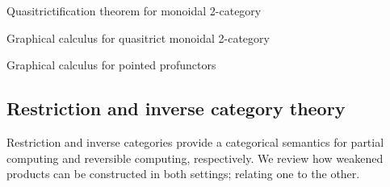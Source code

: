 \begin{theorem}
Quasitrictification theorem for monoidal 2-category
\end{theorem}

\begin{corollary}
Graphical calculus for quasitrict monoidal 2-category
\end{corollary}


\begin{lemma}
Graphical calculus for pointed profunctors

%
\end{lemma}



\subsection{Restriction and inverse category theory}


\label{sec:rest}

Restriction and inverse categories provide a categorical semantics for partial computing and reversible computing, respectively.  We review how weakened products can be constructed in both settings; relating one to the other.

